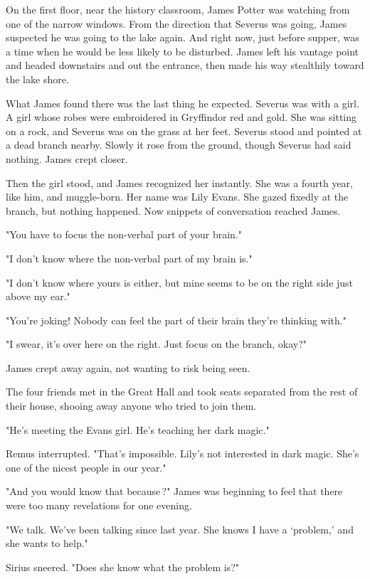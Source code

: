 On the first floor, near the history classroom, James Potter was watching from one of the narrow windows. From the direction that Severus was going, James suspected he was going to the lake again. And right now, just before supper, was a time when he would be less likely to be disturbed. James left his vantage point and headed downstairs and out the entrance, then made his way stealthily toward the lake shore.

What James found there was the last thing he expected. Severus was with a girl. A girl whose robes were embroidered in Gryffindor red and gold. She was sitting on a rock, and Severus was on the grass at her feet. Severus stood and pointed at a dead branch nearby. Slowly it rose from the ground, though Severus had said nothing. James crept closer.

Then the girl stood, and James recognized her instantly. She was a fourth year, like him, and muggle-born. Her name was Lily Evans. She gazed fixedly at the branch, but nothing happened. Now snippets of conversation reached James.

"You have to focus the non-verbal part of your brain."

"I don't know where the non-verbal part of my brain is."

"I don't know where yours is either, but mine seems to be on the right side just above my ear."

"You're joking! Nobody can feel the part of their brain they're thinking with."

"I swear, it's over here on the right. Just focus on the branch, okay?"

James crept away again, not wanting to risk being seen.

The four friends met in the Great Hall and took seats separated from the rest of their house, shooing away anyone who tried to join them.

"He's meeting the Evans girl. He's teaching her dark magic."

Remus interrupted. "That's impossible. Lily's not interested in dark magic. She's one of the nicest people in our year."

"And you would know that because{\el}\,?" James was beginning to feel that there were too many revelations for one evening.

"We talk. We've been talking since last year. She knows I have a `problem,' and she wants to help."

Sirius sneered. "Does she know what the problem is?"


